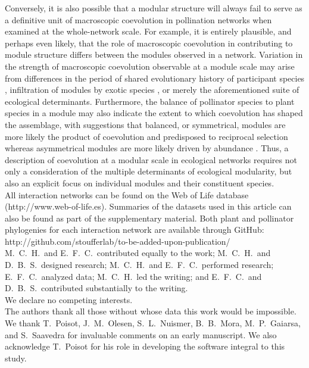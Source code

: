 \documentclass{article}
\begin{document}
	Conversely, it is also possible that a modular structure will always fail to serve as a definitive unit of macroscopic coevolution in pollination networks when examined at the whole-network scale. For example, it is entirely plausible, and perhaps even likely, that the role of macroscopic coevolution in contributing to module structure differs between the modules observed in a network. Variation in the strength of macroscopic coevolution observable at a module scale may arise from differences in the period of shared evolutionary history of participant species \citep{Bascompte2015}, infiltration of modules by exotic species \citep{Traveset2013}, or merely the aforementioned suite of ecological determinants. Furthermore, the balance of pollinator species to plant species in a module may also indicate the extent to which coevolution has shaped the assemblage, with suggestions that balanced, or symmetrical, modules are more likely the product of coevolution and predisposed to reciprocal selection whereas asymmetrical modules are more likely driven by abundance \citep{Hagen2012, Rasmussen2013}. Thus, a description of coevolution at a modular scale in ecological networks requires not only a consideration of the multiple determinants of ecological modularity, but also an explicit focus on individual modules and their constituent species. \\


 All interaction networks can be found on the Web of Life database (http://www.web-of-life.es). Summaries of the datasets used in this article can also be found as part of the supplementary material. Both plant and pollinator phylogenies for each interaction network are available through GitHub: http://github.com/stoufferlab/to-be-added-upon-publication/ \\

M.\ C.\ H.\ and E.\ F.\ C.\ contributed equally to the work; M.\ C.\ H.\ and D.\ B.\ S.\ designed research; M.\ C.\ H.\ and E.\ F.\ C.\ performed research; E.\ F.\ C.\ analyzed data; M.\ C.\ H.\ led the writing; and E.\ F.\ C.\ and D.\ B.\ S.\ contributed substantially to the writing.\\

 We declare no competing interests.\\

 The authors thank all those without whose data this work would be impossible. We thank T.\ Poisot, J.\ M.\ Olesen, S.\ L.\ Nuismer, B.\ B.\ Mora, M.\ P.\ Gaiarsa, and S.\ Saavedra for invaluable comments on an early manuscript. We also acknowledge T.\ Poisot for his role in developing the software integral to this study.\\
\end{document}
